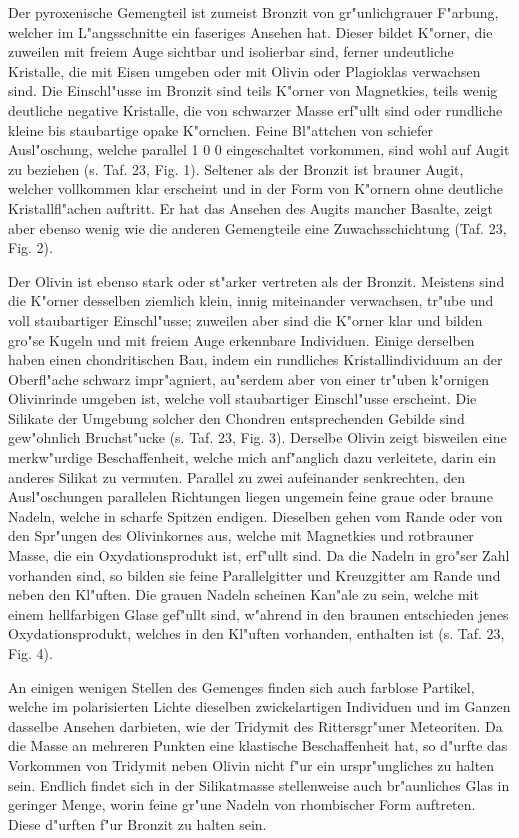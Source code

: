 \documentclass[a4paper, 11pt, oneside, polutonikogreek, german]{article}
\begin{document}
Der pyroxenische Gemengteil ist zumeist Bronzit von gr"unlichgrauer F"arbung, welcher im L"angsschnitte ein faseriges Ansehen hat. Dieser bildet K"orner, die zuweilen mit freiem Auge sichtbar und isolierbar sind, ferner undeutliche Kristalle, die mit Eisen umgeben oder mit Olivin oder Plagioklas verwachsen sind. Die Einschl"usse im Bronzit sind teils K"orner von Magnetkies, teils wenig deutliche negative Kristalle, die von schwarzer Masse erf"ullt sind oder rundliche kleine bis staubartige opake K"ornchen. Feine Bl"attchen von schiefer Ausl"oschung, welche parallel 1 0 0 eingeschaltet vorkommen, sind wohl auf Augit zu beziehen (s. Taf. 23, Fig. 1). Seltener als der Bronzit ist brauner Augit, welcher vollkommen klar erscheint und in der Form von K"ornern ohne deutliche Kristallfl"achen auftritt. Er hat das Ansehen des Augits mancher Basalte, zeigt aber ebenso wenig wie die anderen Gemengteile eine Zuwachsschichtung (Taf. 23, Fig. 2).

Der Olivin ist ebenso stark oder st"arker vertreten als der Bronzit. Meistens sind die K"orner desselben ziemlich klein, innig miteinander verwachsen, tr"ube und voll staubartiger Einschl"usse; zuweilen aber sind die K"orner klar und bilden gro"se Kugeln und mit freiem Auge erkennbare Individuen. Einige derselben haben einen chondritischen Bau, indem ein rundliches Kristallindividuum an der Oberfl"ache schwarz impr"agniert, au"serdem aber von einer tr"uben k"ornigen Olivinrinde umgeben ist, welche voll staubartiger Einschl"usse erscheint. Die Silikate der Umgebung solcher den Chondren entsprechenden Gebilde sind gew"ohnlich Bruchst"ucke (s. Taf. 23, Fig. 3). Derselbe Olivin zeigt bisweilen eine merkw"urdige Beschaffenheit, welche mich anf"anglich dazu verleitete, darin ein anderes Silikat zu vermuten. Parallel zu zwei aufeinander senkrechten, den Ausl"oschungen parallelen Richtungen liegen ungemein feine graue oder braune Nadeln, welche in scharfe Spitzen endigen. Dieselben gehen vom Rande oder von den Spr"ungen des Olivinkornes aus, welche mit Magnetkies und rotbrauner Masse, die ein Oxydationsprodukt ist, erf"ullt sind. Da die Nadeln in gro"ser Zahl vorhanden sind, so bilden sie feine Parallelgitter und Kreuzgitter am Rande und neben den Kl"uften. Die grauen Nadeln scheinen Kan"ale zu sein, welche mit einem hellfarbigen Glase gef"ullt sind, w"ahrend in den braunen entschieden jenes Oxydationsprodukt, welches in den Kl"uften vorhanden, enthalten ist (s. Taf. 23, Fig. 4).

An einigen wenigen Stellen des Gemenges finden sich auch farblose Partikel, welche im polarisierten Lichte dieselben zwickelartigen Individuen und im Ganzen dasselbe Ansehen darbieten, wie der Tridymit des Rittersgr"uner Meteoriten. Da die Masse an mehreren Punkten eine klastische Beschaffenheit hat, so d"urfte das Vorkommen von Tridymit neben Olivin nicht f"ur ein urspr"ungliches zu halten sein. Endlich findet sich in der Silikatmasse stellenweise auch br"aunliches Glas in geringer Menge, worin feine gr"une Nadeln von rhombischer Form auftreten. Diese d"urften f"ur Bronzit zu halten sein.
\end{document}
